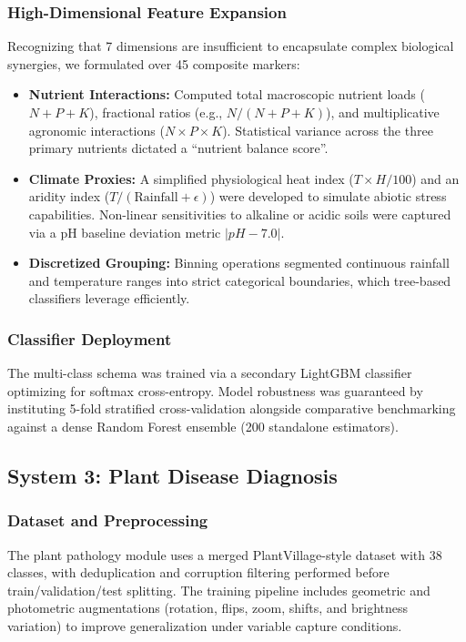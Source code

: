 \documentclass[conference]{IEEEtran}
\begin{document}
\subsubsection{High-Dimensional Feature Expansion}
Recognizing that 7 dimensions are insufficient to encapsulate complex biological synergies, we formulated over 45 composite markers:
\begin{itemize}
    \item \textbf{Nutrient Interactions:} Computed total macroscopic nutrient loads ($N+P+K$), fractional ratios (e.g., $N/(N+P+K)$), and multiplicative agronomic interactions ($N \times P \times K$). Statistical variance across the three primary nutrients dictated a ``nutrient balance score''.
    \item \textbf{Climate Proxies:} A simplified physiological heat index ($T \times H / 100$) and an aridity index ($T / (\text{Rainfall} + \epsilon)$) were developed to simulate abiotic stress capabilities. Non-linear sensitivities to alkaline or acidic soils were captured via a pH baseline deviation metric $|pH - 7.0|$.
    \item \textbf{Discretized Grouping:} Binning operations segmented continuous rainfall and temperature ranges into strict categorical boundaries, which tree-based classifiers leverage efficiently.
\end{itemize}

\subsubsection{Classifier Deployment}
The multi-class schema was trained via a secondary LightGBM classifier optimizing for softmax cross-entropy. Model robustness was guaranteed by instituting 5-fold stratified cross-validation alongside comparative benchmarking against a dense Random Forest ensemble (200 standalone estimators).

\subsection{System 3: Plant Disease Diagnosis}

\subsubsection{Dataset and Preprocessing}
The plant pathology module uses a merged PlantVillage-style dataset with 38 classes, with deduplication and corruption filtering performed before train/validation/test splitting. The training pipeline includes geometric and photometric augmentations (rotation, flips, zoom, shifts, and brightness variation) to improve generalization under variable capture conditions.
\end{document}
